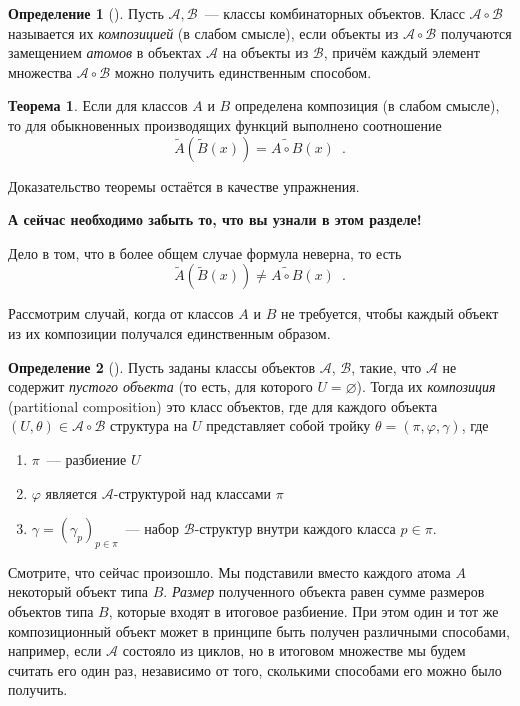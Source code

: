 \documentclass{article}
\theoremstyle{definition}
\newtheorem*{theorem}{Теорема}
\newtheorem*{definition}{Определение}
\begin{document}
\begin{definition}[{\cite[Определение 2.2.20, с.49]{gouldenjackson}}]
	Пусть \( \mathcal A, \mathcal B \)~--- классы комбинаторных объектов. Класс 
	\( \mathcal A \circ \mathcal B \) называется их \textit{композицией}
(в слабом смысле), если 
	объекты из \( \mathcal A \circ \mathcal B \) получаются замещением 
	\textit{атомов} в объектах \( \mathcal A \) на объекты из \( \mathcal B \), 
	причём каждый элемент множества \( \mathcal A \circ \mathcal B \) можно 
	получить единственным способом.
\end{definition}
\begin{theorem}
    Если для классов \( A \) и \( B \) определена композиция (в слабом смысле),
то для обыкновенных производящих функций выполнено соотношение
\[
    \widetilde A( \widetilde B(x)) = \widetilde{A \circ B}(x) \enspace .
\]    
\end{theorem}
Доказательство теоремы остаётся в качестве упражнения.

\textbf{А сейчас необходимо забыть то, что вы узнали в этом разделе!}

Дело в том, что в более общем случае формула неверна, то есть 
\[
    \widetilde A( \widetilde B(x)) \neq \widetilde{A \circ B}(x) \enspace .
\]    

Рассмотрим случай, когда от классов \( A \) и \( B \) не требуется, чтобы каждый
объект из их композиции получался единственным образом.
\begin{definition}[{\cite[p.43]{species}}]
	Пусть заданы классы объектов \( \mathcal A \), \( \mathcal B \), такие, что 
	\( \mathcal A \) не содержит \textit{пустого объекта} (то есть, для 
	которого 
	\( U = \varnothing \)). 
	 Тогда их \textit{композиция} (partitional composition) это класс объектов, 
	 где для каждого объекта \( (U, \theta) \in \mathcal A \circ \mathcal B \) 
	 структура на \( U \) представляет собой тройку \( \theta = (\pi, \varphi, \gamma) \), где
	\begin{enumerate}
		\item \( \pi \)~--- разбиение \( U \)
		\item \( \varphi \) является \( \mathcal A \)-структурой над классами 
		\( \pi \)
		\item \( \gamma = (\gamma_p)_{p \in \pi} \)~--- набор \( 
		\mathcal B \)-структур внутри каждого класса \( p \in \pi \).
	\end{enumerate}
\end{definition}
Смотрите, что сейчас произошло. Мы подставили вместо каждого атома \( A \)
некоторый объект типа \( B \). \textit{Размер} полученного объекта равен сумме
размеров объектов типа \( B \), которые входят в итоговое разбиение. При этом
один и тот же композиционный объект может в принципе быть получен различными
способами, например, если \(\mathcal A\) состояло из циклов, но в итоговом множестве мы будем считать его один раз, независимо от
того, сколькими способами его можно было получить.
\end{document}
